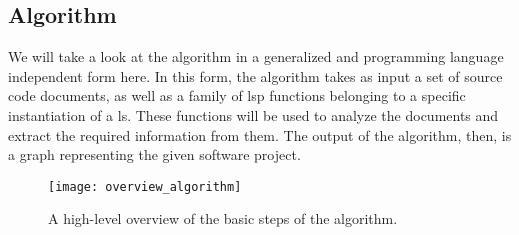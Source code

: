\documentclass[../thesis]{subfiles}
\begin{document}
\subsection{Algorithm}

We will take a look at the algorithm in a generalized and programming language independent form here.
In this form, the algorithm takes as input a set of source code documents, as well as a family of \gls{lsp} functions belonging to a specific instantiation of a \gls{ls}.
These functions will be used to analyze the documents and extract the required information from them.
The output of the algorithm, then, is a graph representing the given software project.

\begin{figure}
	\begin{center}
		\texttt{[image: overview\_algorithm]}
	\end{center}
	\caption{A high-level overview of the basic steps of the algorithm.}\label{fig:alg_overview}
\end{figure}
\end{document}
